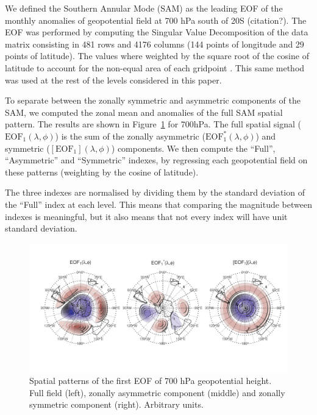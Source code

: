 \documentclass[]{ametsocV5}
\begin{document}
We defined the Southern Annular Mode (SAM) as the leading EOF of the
monthly anomalies of geopotential field at 700 hPa south of 20\degree S
(citation?). The EOF was performed by computing the Singular Value
Decomposition of the data matrix consisting in 481 rows and 4176 columns
(144 points of longitude and 29 points of latitude). The values where
weighted by the square root of the cosine of latitude to account for the
non-equal area of each gridpoint \citep{chung1999}. This same method was
used at the rest of the levels considered in this paper.

To separate between the zonally symmetric and asymmetric components of
the SAM, we computed the zonal mean and anomalies of the full SAM
spatial pattern. The results are shown in Figure~\ref{fig:method} for
700hPa. The full spatial signal (\(\mathrm{EOF_1}(\lambda, \phi)\)) is
the sum of the zonally asymmetric (\(\mathrm{EOF_1^*}(\lambda, \phi)\))
and symmetric (\([\mathrm{EOF_1}](\lambda, \phi)\)) components. We then
compute the ``Full'', ``Asymmetric'' and ``Symmetric'' indexes, by
regressing each geopotential field on these patterns (weighting by the
cosine of latitude).

The three indexes are normalised by dividing them by the standard
deviation of the ``Full'' index at each level. This means that comparing
the magnitude between indexes is meaningful, but it also means that not
every index will have unit standard deviation.

\begin{figure}
\includegraphics{method-1} \caption[Spatial patterns of the first EOF of 700 hPa geopotential height]{Spatial patterns of the first EOF of 700 hPa geopotential height. Full field (left), zonally asymmetric component (middle) and zonally symmetric component (right). Arbitrary units.}\label{fig:method}
\end{figure}
\end{document}
